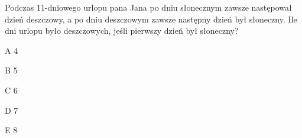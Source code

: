 \begin{tresc}
Podczas 11-dniowego urlopu pana Jana po dniu słonecznym zawsze następował dzień deszczowy, a po dniu deszczowym zawsze następny dzień był słoneczny. Ile dni urlopu było deszczowych, jeśli pierwszy dzień był słoneczny?
\end{tresc}
\begin{wariant}{A} 4 \end{wariant}
\begin{wariant}{B} 5 \end{wariant}
\begin{wariant}{C} 6 \end{wariant}
\begin{wariant}{D} 7 \end{wariant}
\begin{wariant}{E} 8 \end{wariant}
